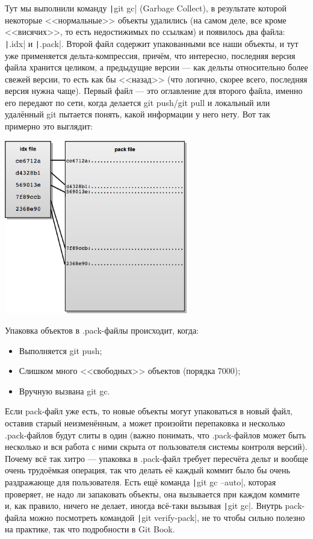 \documentclass[a5paper]{article}
\begin{document}
Тут мы выполнили команду \texttt|git gc| (Garbage Collect), в результате которой некоторые <<нормальные>> объекты удалились (на самом деле, все кроме <<висячих>>, то есть недостижимых по ссылкам) и появилось два файла: \texttt|.idx| и \texttt|.pack|. Второй файл содержит упакованными все наши объекты, и тут уже применяется дельта-компрессия, причём, что интересно, последняя версия файла хранится целиком, а предыдущие версии --- как дельты относительно более свежей версии, то есть как бы <<назад>> (что логично, скорее всего, последняя версия нужна чаще). Первый файл --- это оглавление для второго файла, именно его передают по сети, когда делается git push/git pull и локальный или удалённый git пытается понять, какой информации у него нету. Вот так примерно это выглядит:

\begin{center}
    \includegraphics[width=0.6\textwidth]{gitPackFiles.png}
\end{center}

Упаковка объектов в .pack-файлы происходит, когда:
\begin{itemize}
    \item Выполняется git push;
    \item Слишком много <<свободных>> объектов (порядка 7000);
    \item Вручную вызвана git gc.
\end{itemize}

Если pack-файл уже есть, то новые объекты могут упаковаться в новый файл, оставив старый неизменённым, а может произойти перепаковка и несколько .pack-файлов будут слиты в один (важно понимать, что .pack-файлов может быть несколько и вся работа с ними скрыта от пользователя системы контроля версий). Почему всё так хитро --- упаковка в .pack-файл требует пересчёта дельт и вообще очень трудоёмкая операция, так что делать её каждый коммит было бы очень раздражающе для пользователя. Есть ещё команда \texttt|git gc --auto|, которая проверяет, не надо ли запаковать объекты, она вызывается при каждом коммите и, как правило, ничего не делает, иногда всё-таки вызывая \texttt|git gc|. Внутрь pack-файла можно посмотреть командой \texttt|git verify-pack|, не то чтобы сильно полезно на практике, так что подробности в Git Book.
\end{document}
